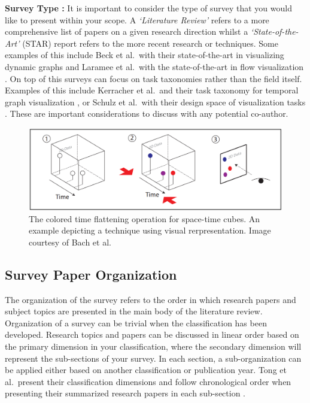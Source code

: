 \textbf{Survey Type \cons :} It is important to consider the type of survey that you would like to present within your scope. A \textit{`Literature Review'} refers to a more comprehensive list of papers on a given research direction whilst a \textit{`State-of-the-Art'} (STAR) report refers to the more recent research or techniques. Some examples of this include  Beck et al.\ with their state-of-the-art in visualizing dynamic graphs \cite{beck2014state} and Laramee et al.\ with the state-of-the-art in flow visualization \cite{laramee2004state}. On top of this surveys can focus on task taxonomies rather than the field itself. Examples of this include Kerracher et al.\ and their task taxonomy for temporal graph visualization \cite{kerracher2015task}, or Schulz et al.\ with their design space of visualization tasks \cite{schulz2013design}. These are important considerations to discuss with any potential co-author.

\begin{figure}
\centering
\includegraphics[width=1\linewidth]{pictures/sto.png}
\caption{The colored time flattening operation for space-time cubes. An example depicting a technique using visual rerpresentation. Image courtesy of Bach et al.\ \cite{bach2014review}} \label{fig:sto}
\end{figure}

\subsection{Survey Paper Organization}
The organization of the survey refers to the order in which research papers and subject topics are presented in the main body of the literature review. Organization of a survey can be trivial when the classification has been developed. Research topics and papers can be discussed in linear order based on the primary dimension in your classification, where the secondary dimension will represent the sub-sections of your survey. In each section, a sub-organization can be applied either based on another classification or publication year. Tong et al.\  present their classification dimensions and follow chronological order when presenting their summarized research papers in each sub-section \cite{tong2018storytelling}. 

